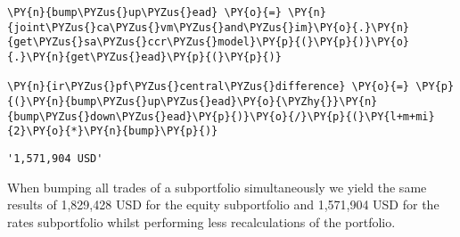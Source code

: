 \begin{tcolorbox}[breakable, size=fbox, boxrule=1pt, pad at break*=1mm,colback=cellbackground, colframe=cellborder]
\begin{Verbatim}[commandchars=\\\{\}]
\PY{n}{bump\PYZus{}up\PYZus{}ead} \PY{o}{=} \PY{n}{joint\PYZus{}ca\PYZus{}vm\PYZus{}and\PYZus{}im}\PY{o}{.}\PY{n}{get\PYZus{}sa\PYZus{}ccr\PYZus{}model}\PY{p}{(}\PY{p}{)}\PY{o}{.}\PY{n}{get\PYZus{}ead}\PY{p}{(}\PY{p}{)}

\PY{n}{ir\PYZus{}pf\PYZus{}central\PYZus{}difference} \PY{o}{=} \PY{p}{(}\PY{n}{bump\PYZus{}up\PYZus{}ead}\PY{o}{\PYZhy{}}\PY{n}{bump\PYZus{}down\PYZus{}ead}\PY{p}{)}\PY{o}{/}\PY{p}{(}\PY{l+m+mi}{2}\PY{o}{*}\PY{n}{bump}\PY{p}{)}
\end{Verbatim}
\end{tcolorbox}

            \begin{tcolorbox}[breakable, size=fbox, boxrule=.5pt, pad at break*=1mm, opacityfill=0]
\begin{Verbatim}[commandchars=\\\{\}]
'1,571,904 USD'
\end{Verbatim}
\end{tcolorbox}
        
    When bumping all trades of a subportfolio simultaneously we yield the
same results of 1,829,428 USD for the equity subportfolio and 1,571,904
USD for the rates subportfolio whilst performing less recalculations of
the portfolio.

    


